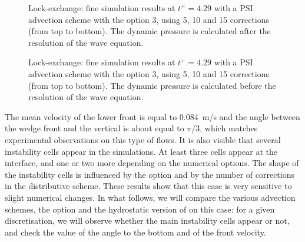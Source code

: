 \begin{figure}[ht]
  \begin{center}
    \caption{Lock-exchange: fine simulation results at $t^+=4.29$ with a PSI advection scheme
      with the option 3, using 5, 10 and 15 corrections (from top to bottom).
      The dynamic pressure is calculated after the resolution of the wave equation.}
    \label{fig:fine_sim}
  \end{center}
\end{figure}
\begin{figure}[ht]
  \begin{center}
    \caption{Lock-exchange: fine simulation results at $t^+=4.29$ with a PSI advection scheme
      with the option 3, using 5, 10 and 15 corrections (from top to bottom).
      The dynamic pressure is calculated before the resolution of the wave equation.}
    \label{fig:fine_sim_dpwaveq}
  \end{center}
\end{figure}

The mean velocity of the lower front is equal to $0.084$~m/s and the angle
between the wedge front and the
vertical is about equal to $\pi/3$, which matches experimental observations on
this type of flows.
It is also visible that several instability cells appear in the simulations.
At least three cells appear at the interface,
and one or two more depending on the numerical options.
The shape of the instability cells is influenced by the option
and by the number of corrections in the distributive scheme.
These results show that this case is very sensitive to slight numerical changes.
In what follows, we will compare the various advection schemes, the
 option and
the hydrostatic version of  on this case: for a given discretisation,
we will observe whether the
main instability cells appear or not, and check the value of the angle to the
bottom and of the front velocity.

